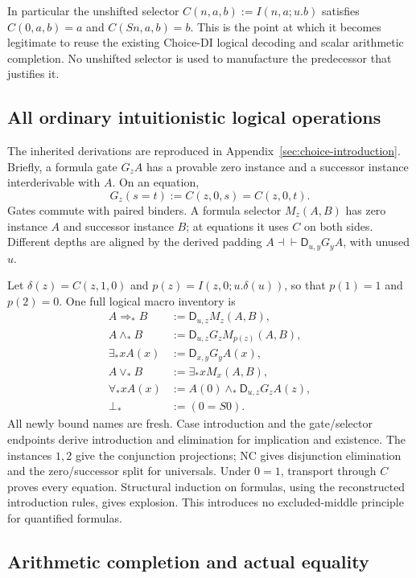 \documentclass[11pt,letterpaper]{article}
\theoremstyle{definition}\newtheorem{definition}[theorem]{Definition}
\theoremstyle{remark}\newtheorem{remark}[theorem]{Remark}
\newcommand{\D}{\mathsf D}
\begin{document}
In particular the unshifted selector
$C(n,a,b):=I(n,a;u.b)$ satisfies $C(0,a,b)=a$ and $C(Sn,a,b)=b$.
This is the point at which it becomes legitimate to reuse the existing
Choice-DI logical decoding and scalar arithmetic completion. No unshifted
selector is used to manufacture the predecessor that justifies it.

\subsection{All ordinary intuitionistic logical operations}

The inherited derivations are reproduced in
Appendix~\ref{sec:choice-introduction}. Briefly, a formula gate $G_zA$
has a provable zero instance and a successor instance interderivable
with $A$. On an equation,
\[
 G_z(s=t):=C(z,0,s)=C(z,0,t).
\]
Gates commute with paired binders. A formula selector $M_z(A,B)$ has
zero instance $A$ and successor instance $B$; at equations it uses $C$
on both sides. Different depths are aligned by the derived padding
$A\dashv\vdash\D_{u,y}G_yA$, with unused $u$.

Let $\delta(z)=C(z,1,0)$ and $p(z)=I(z,0;u.\delta(u))$, so that
$p(1)=1$ and $p(2)=0$. One full logical macro inventory is
\[
\begin{aligned}
 A\Rightarrow_*B&:=\D_{u,z}M_z(A,B),\\
 A\wedge_*B&:=\D_{u,z}G_zM_{p(z)}(A,B),\\
 \exists_*xA(x)&:=\D_{x,y}G_yA(x),\\
 A\vee_*B&:=\exists_*xM_x(A,B),\\
 \forall_*xA(x)&:=A(0)\wedge_*\D_{u,z}G_zA(z),\\
 \bot_*&:=(0=S0).
\end{aligned}
\]
All newly bound names are fresh. Case introduction and the gate/selector
endpoints derive introduction and elimination for implication and
existence. The instances $1,2$ give the conjunction projections; NC gives
disjunction elimination and the zero/successor split for universals.
Under $0=1$, transport through $C$ proves every equation. Structural
induction on formulas, using the reconstructed introduction rules, gives
explosion. This introduces no excluded-middle principle for quantified
formulas.

\subsection{Arithmetic completion and actual equality}
\end{document}

